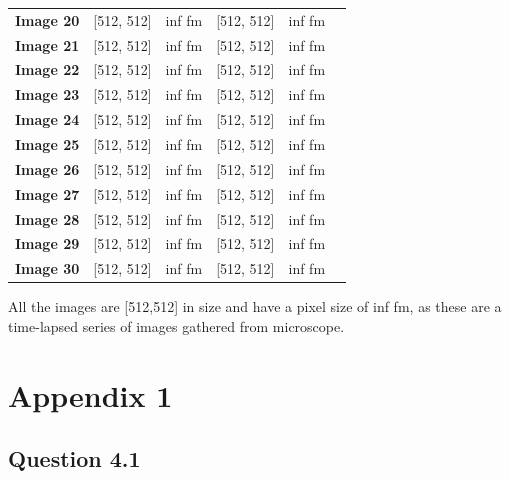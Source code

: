 \documentclass{article}
\begin{document}
\begin{table}[h!]
\begin{tabular}{|c|c|c|c|c|c|}
\textbf{Image 20} & [512, 512] & {inf fm} & [512, 512] & {inf fm} \\
\textbf{Image 21} & [512, 512] & {inf fm} & [512, 512] & {inf fm} \\
\textbf{Image 22} & [512, 512] & {inf fm} & [512, 512] & {inf fm} \\
\textbf{Image 23} & [512, 512] & {inf fm} & [512, 512] & {inf fm} \\
\textbf{Image 24} & [512, 512] & {inf fm} & [512, 512] & {inf fm} \\
\textbf{Image 25} & [512, 512] & {inf fm} & [512, 512] & {inf fm} \\
\textbf{Image 26} & [512, 512] & {inf fm} & [512, 512] & {inf fm} \\
\textbf{Image 27} & [512, 512] & {inf fm} & [512, 512] & {inf fm} \\
\textbf{Image 28} & [512, 512] & {inf fm} & [512, 512] & {inf fm} \\
\textbf{Image 29} & [512, 512] & {inf fm} & [512, 512] & {inf fm} \\
\textbf{Image 30} & [512, 512] & {inf fm} & [512, 512] & {inf fm} \\
\hline
\end{tabular}
\end{table}
All the images are [512,512] in size and have a pixel size of {inf fm}, as these are a time-lapsed series of images gathered from microscope. 
\newpage
\section*{Appendix 1}
\subsection*{Question 4.1}
\end{document}
